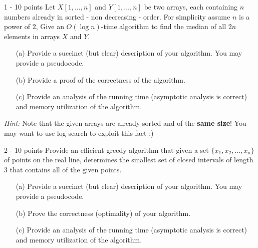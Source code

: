 \documentclass{common/cs157}
\begin{document}
\midtermpolicyremind{}

\begin{problem}{1 - 10 points}
Let $X[1,\ldots,n]$ and $Y[1,\ldots,n]$ be two arrays, each containing $n$ numbers already in sorted - non decreasing - order. For simplicity assume $n$ is a power of $2$, Give an $O(\log n)$-time algorithm to find the median of all $2n$ elements in arrays $X$ and $Y$.
\begin{enumerate}
    \item[(a)] Provide a succinct (but clear) description of your algorithm. You may provide a pseudocode.
    \item[(b)] Provide a proof of the correctness of the algorithm.
    \item[(c)] Provide an analysis of the running time (asymptotic analysis is correct) and memory utilization of the algorithm.
\end{enumerate}
\noindent \emph{Hint:} Note that the given arrays are already sorted and of the \textbf{same size}! You may want to use log search to exploit this fact :)
\end{problem}


\begin{problem}{2 - 10 points}
Provide an efficient greedy algorithm that given a set $\{x_1,x_2,\ldots,x_n\}$ of points on the real line, determines the smallest set of  closed intervals of length 3 that contains all of the given points.
\begin{enumerate}
    \item[(a)] Provide a succinct (but clear) description of your algorithm. You may provide a pseudocode.
    \item[(b)] Prove the correctness (optimality) of your algorithm.
    \item[(c)] Provide an analysis of the running time (asymptotic analysis is correct) and memory utilization of the algorithm.
\end{enumerate}
\end{problem}
\end{document}
